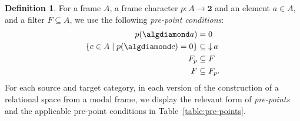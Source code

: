 \documentclass{article}[a4paper]
\theoremstyle{definition}
\newtheorem{definition}{Definition}%
\newcommand{\twobb}{\mathbf{2}}
\DeclareMathOperator{\downset}{\downarrow}
\begin{document}
\begin{definition}
For a frame $A$, a frame character $p:A \longrightarrow \twobb$ and an element $a \in A$, and a filter $F\subseteq A$, we use the following \emph{pre-point conditions}:
\begin{align}
\label{condition:pairs}
p(\algdiamond a) &= 0 \\
\label{condition:triples-lsc}
\{ c \in A \mid p(\algdiamond c) = 0 \} & \subseteq \downset a  \\
\label{condition:triples}
F_p & \subseteq F \\
\label{condition:triples-usc}
F & \subseteq F_p .
\end{align}
For each source and target category, in each version of the construction of a relational space from a modal frame, we display the relevant form of \emph{pre-points} and the applicable pre-point conditions in Table~\ref{table:pre-points}.
\end{definition}
\end{document}
